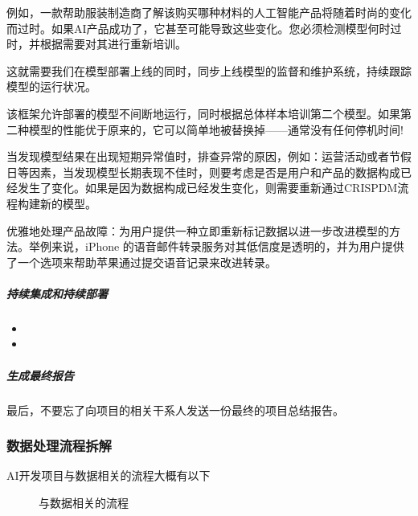 \documentclass[letterpaper,11pt,english]{sphinxmanual}
\begin{document}
例如，一款帮助服装制造商了解该购买哪种材料的人工智能产品将随着时尚的变化而过时。如果AI产品成功了，它甚至可能导致这些变化。您必须检测模型何时过时，并根据需要对其进行重新培训。

这就需要我们在模型部署上线的同时，同步上线模型的监督和维护系统，持续跟踪模型的运行状况。

该框架允许部署的模型不间断地运行，同时根据总体样本培训第二个模型。如果第二种模型的性能优于原来的，它可以简单地被替换掉——通常没有任何停机时间!

当发现模型结果在出现短期异常值时，排查异常的原因，例如：运营活动或者节假日等因素，当发现模型长期表现不佳时，则要考虑是否是用户和产品的数据构成已经发生了变化。如果是因为数据构成已经发生变化，则需要重新通过CRISP\sphinxhyphen{}DM流程构建新的模型。

优雅地处理产品故障：为用户提供一种立即重新标记数据以进一步改进模型的方法。举例来说，iPhone
的语音邮件转录服务对其低信度是透明的，并为用户提供了一个选项来帮助苹果通过提交语音记录来改进转录。%
\begin{footnote}[728]\sphinxAtStartFootnote
{}
%
\end{footnote}


\subparagraph{持续集成和持续部署}
\label{\detokenize{chapter_project/process:id33}}\begin{itemize}
\item {} 

\item {} 

\end{itemize}


\subparagraph{生成最终报告}
\label{\detokenize{chapter_project/process:id34}}
最后，不要忘了向项目的相关干系人发送一份最终的项目总结报告。


\subsubsection{数据处理流程拆解}
\label{\detokenize{chapter_project/Data Process:id1}}\label{\detokenize{chapter_project/Data Process::doc}}
AI开发项目与数据相关的流程大概有以下

\begin{figure}[H]
\centering
\capstart

\noindent{}
\caption{与数据相关的流程}\label{\detokenize{chapter_project/Data Process:id8}}\end{figure}
\end{document}
